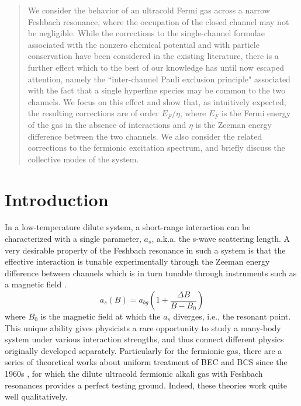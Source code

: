 \documentclass[reprint,pra]{revtex4-1}
\newcommand{\br}[1]{\ensuremath{\left(#1\right)}}
\begin{document}
\begin{abstract}
We consider the behavior of an ultracold Fermi gas across a narrow
Feshbach resonance, where the occupation of the closed channel may not be
negligible. While the corrections to the single-channel formulae associated
with the nonzero chemical potential and with particle conservation have
been considered in the existing literature, there is a further effect which
to the best of our knowledge has until now escaped attention, namely the
``inter-channel Pauli exclusion principle" associated with the fact that
a single hyperfine species may be common to the two channels. We focus on
this effect and show that, as intuitively expected, the resulting
corrections are of order $E_F/\eta$, where $E_F$ is the Fermi energy of the gas
in the absence of interactions and $\eta$ is the Zeeman energy difference
between the two channels. We also consider the related corrections
to the fermionic excitation spectrum, and briefly discuss the collective
modes of the system.
\end{abstract}
\maketitle


\section{Introduction}

In a low-temperature dilute system, a short-range interaction can be characterized with a single parameter, $a_s$, a.k.a. the s-wave scattering length.    A very desirable property of the Feshbach resonance in such a system is that the effective interaction is tunable experimentally through the Zeeman energy difference between channels which is in turn  tunable through  instruments such as a magnetic field  \cite{Fano,nuclear,ChinRMP,Pethick}. 
 \begin{equation}
a_{s}(B)=a_{bg}\br{1+\frac{\Delta{B}}{B-B_{0}}}
\end{equation}
where $B_{0}$ is the magnetic field at which the $a_{s}$ diverges, i.e., the  resonant point. 
This unique ability gives physicists a rare opportunity to study  a many-body system under various interaction strengths,  and thus connect different physics originally developed separately.  Particularly for the fermionic gas, there are a series of  theoretical works about uniform treatment of  BEC and BCS since the 1960s \cite{Eagle,LeggettCrossover,Nozieres,RanderiaBEC}, for which the dilute ultracold fermionic alkali gas with  Feshbach resonances provides a perfect testing ground.  Indeed,  these theories work quite well  qualitatively.  
\end{document}

